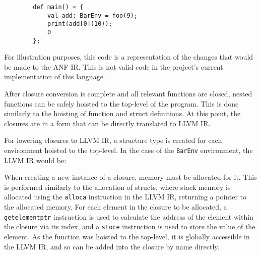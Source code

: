 \begin{tcolorbox}
    \begin{verbatim}
        def main() = {
            val add: BarEnv = foo(9);
            print(add[0](10));
            0
        };
    \end{verbatim}
    \tcblower
    \footnotesize
    For illustration purposes, this code is a representation of the changes that would be made
    to the ANF IR. This is not valid code in the project's current implementation of this language.
\end{tcolorbox}

After closure conversion is complete and all relevant functions are closed, nested functions can be
safely hoisted to the top-level of the program. This is done similarly to the hoisting of
function and struct definitions. At this point, the closures are in a form that can be directly
translated to LLVM IR.

For lowering closures to LLVM IR, a structure type is created for each environment hoisted to the
top-level. In the case of the \texttt{BarEnv} environment, the LLVM IR would be:


When creating a new instance of a closure, memory must be allocated for it. This is performed
similarly to the allocation of structs, where stack memory is allocated using the \texttt{alloca}
instruction in the LLVM IR, returning a pointer to the allocated memory. For each element in the
closure to be allocated, a \texttt{getelementptr} instruction is used to calculate the address of
the element within the closure via its index, and a \texttt{store} instruction is used to store the
value of the element. As the function was hoisted to the top-level, it is globally accessible in the
LLVM IR, and so can be added into the closure by name directly.

